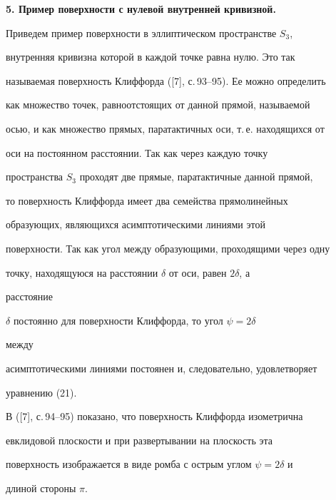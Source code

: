  


{\bf 5. Пример поверхности с нулевой внутренней кривизной.} 


Приведем пример поверхности в эллиптическом пространстве $S_3$, 


внутренняя кривизна которой в каждой точке равна нулю. Это так 


называемая поверхность Клиффорда ([7], с.\,93--95). Ее можно определить 


как множество точек, равноотстоящих от данной прямой, называемой 


осью, и как множество прямых, паратактичных оси, т.\,е. находящихся от 


оси на постоянном расстоянии. Так как через каждую точку 


пространства $S_3$ проходят две прямые, паратактичные данной прямой, 


то поверхность Клиффорда имеет два семейства прямолинейных 


образующих, являющихся асимптотическими линиями этой 


поверхности. Так как угол между образующими, проходящими через одну 


точку, находящуюся на расстоянии $\delta$ от оси, равен $2\delta$, а 


расстояние 


$\delta$ постоянно для поверхности Клиффорда, то угол $\psi=2\delta$ 


между 


асимптотическими линиями постоянен и, следовательно, удовлетворяет 


уравнению (21). 


 


В ([7], с.\,94--95) показано, что поверхность Клиффорда изометрична 


евклидовой плоскости и при развертывании на плоскость эта 


поверхность изображается в виде ромба с острым углом $\psi=2\delta$ и 


длиной стороны $\pi$. 


 


